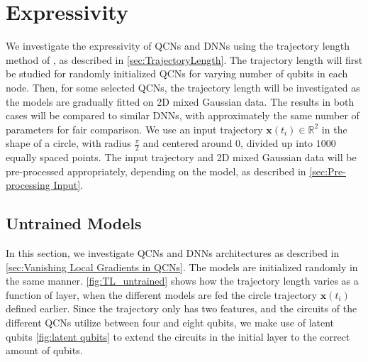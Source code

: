 \section{Expressivity}\label{sec:Expressivity}
We investigate the expressivity of QCNs and DNNs using the trajectory length method of \citet{raghu2017expressive}, as described in \cref{sec:TrajectoryLength}. The trajectory length will first be  studied for randomly initialized QCNs for varying number of qubits in each node. Then, for some selected QCNs, the trajectory length will be investigated as the models are gradually fitted on 2D mixed Gaussian data. The results in both cases will be compared to similar DNNs, with approximately the same number of parameters for fair comparison. We use an input trajectory $\boldsymbol{x}(t_i) \in \mathbb{R}^2$ in the shape of a circle, with radius $\frac{\pi}{2}$ and centered around $0$, divided up into $1000$ equally spaced points. The input trajectory and 2D mixed Gaussian data will be pre-processed appropriately, depending on the model, as described in \cref{sec:Pre-processing Input}. 

\subsection{Untrained Models}\label{sec:Untrained Models}

In this section, we investigate QCNs and DNNs architectures as described in \cref{sec:Vanishing Local Gradients in QCNs}. 
The models are initialized randomly in the same manner. \cref{fig:TL_untrained} shows how the trajectory length varies as a function of layer, when the different models are fed the circle trajectory $\boldsymbol{x}(t_i)$ defined earlier. Since the trajectory only has two features, and the circuits of the different QCNs utilize between four and eight qubits, we make use of latent qubits \cref{fig:latent qubits} to extend the circuits in the initial layer to the correct amount of qubits.





